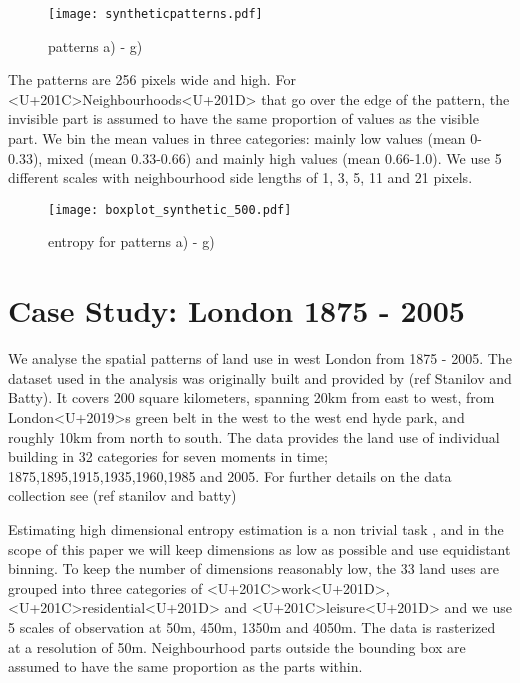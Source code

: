 \documentclass[fleqn,10pt]{wlscirep}
\begin{document}
\begin{figure}[h]
   \centering
   \texttt{[image: syntheticpatterns.pdf]}
   \caption{patterns a) - g)}
   \label{fig:synthetic}
\end{figure}

The patterns are 256 pixels wide and high. For <U+201C>Neighbourhoods<U+201D> that go over the edge of the pattern, the invisible part is assumed to have the same proportion of values as the visible part. We bin the mean values in three categories: mainly low values (mean 0-0.33), mixed (mean 0.33-0.66) and mainly high values (mean 0.66-1.0). We use 5 different scales with neighbourhood side lengths of 1, 3, 5, 11 and 21 pixels.
\begin{figure}[h]

   \centering
   \texttt{[image: boxplot\_synthetic\_500.pdf]}
   \caption{entropy for patterns a) - g)}
   \label{fig:synth_ents_combined}
\end{figure}







\section*{Case Study: London 1875 - 2005}


\noindent We analyse the spatial patterns of land use in west London from 1875 - 2005. The dataset used in the analysis was originally built and provided by (ref Stanilov and Batty). It covers 200 square kilometers, spanning 20km from east to west, from London<U+2019>s green belt in the west to the west end hyde park, and roughly 10km from north to south. The data provides the land use of individual building in 32 categories for seven moments in time; 1875,1895,1915,1935,1960,1985 and 2005.
For further details on the data collection see (ref stanilov and batty)

\noindent Estimating high dimensional entropy estimation is a non trivial task \cite{Voronoi,KdEntropy}, and in the scope of this paper we will keep dimensions as low as possible and use equidistant binning. To keep the number of dimensions reasonably low, the 33 land uses are grouped into three categories of <U+201C>work<U+201D>, <U+201C>residential<U+201D> and <U+201C>leisure<U+201D> and we use 5 scales of observation at 50m, 450m, 1350m and 4050m. The data is rasterized at a resolution of 50m. Neighbourhood parts outside the bounding box are assumed to have the same proportion as the parts within.
\end{document}
